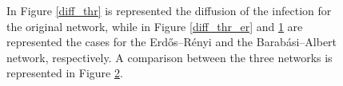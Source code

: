 \begin{figure}[H]
        \begin{subfigure}{0.33\textwidth}
            \caption{}
            \label{diff_thr_ba}
        \end{subfigure}
        \begin{subfigure}{0.33\textwidth}
            \caption{}
            \label{diff_thr_comparison}
        \end{subfigure}
        \caption{In Figure \ref{diff_thr} is represented the diffusion of the infection for the original network,
        while in Figure \ref{diff_thr_er} and \ref{diff_thr_ba} are represented the cases for the Erdős–Rényi and
        the Barabási–Albert network, respectively. A comparison between the three networks is represented in Figure
        \ref{diff_thr_comparison}.}
        \label{diff_thr_total}
    \end{figure}


